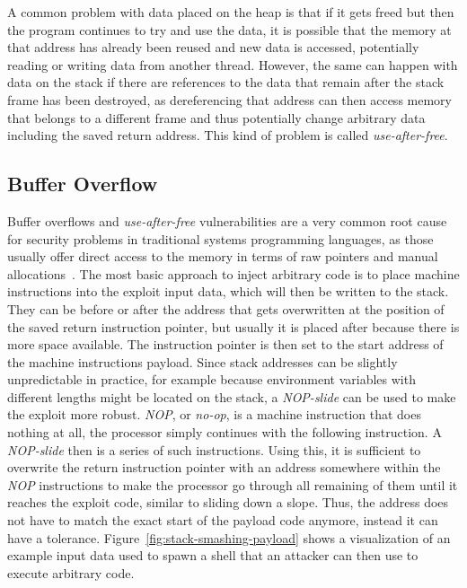 A common problem with data placed on the heap is that if it gets freed but then the program continues to try and use the
data, it is possible that the memory at that address has already been reused and new data is accessed, potentially
reading or writing data from another thread.
However, the same can happen with data on the stack if there are references to the data that remain after the stack
frame has been destroyed, as dereferencing that address can then access memory that belongs to a different frame and
thus potentially change arbitrary data including the saved return address.
This kind of problem is called \textit{use-after-free}.



\subsection{Buffer Overflow}\label{subsec:background:exploit-techniques:buffer-overflow}

Buffer overflows and \textit{use-after-free} vulnerabilities are a very common root cause for security problems in
traditional systems programming languages, as those usually offer direct access to the memory in terms of raw pointers
and manual allocations~\cite{larochelle2001}.
The most basic approach to inject arbitrary code is to place machine instructions into the exploit input data, which
will then be written to the stack.
They can be before or after the address that gets overwritten at the position of the saved return instruction pointer,
but usually it is placed after because there is more space available.
The instruction pointer is then set to the start address of the machine instructions payload.
Since stack addresses can be slightly unpredictable in practice, for example because environment variables with
different lengths might be located on the stack, a \textit{NOP-slide} can be used to make the exploit more robust.
\textit{NOP}, or \textit{no-op}, is a machine instruction that does nothing at all, the processor simply continues with
the following instruction.
A \textit{NOP-slide} then is a series of such instructions.
Using this, it is sufficient to overwrite the return instruction pointer with an address somewhere within the
\textit{NOP} instructions to make the processor go through all remaining of them until it reaches the exploit code,
similar to sliding down a slope.
Thus, the address does not have to match the exact start of the payload code anymore, instead it can have a tolerance.
Figure~\ref{fig:stack-smashing-payload} shows a visualization of an example input data used to spawn a shell that an
attacker can then use to execute arbitrary code.


